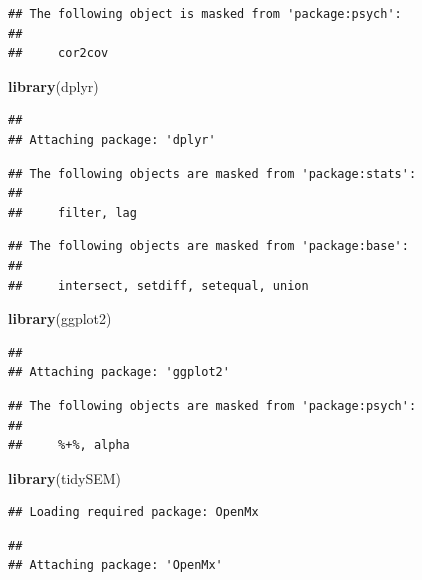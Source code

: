 \documentclass[
  11pt,
]{book}
\newenvironment{Shaded}{\begin{snugshade}}{\end{snugshade}}
\newcommand{\FunctionTok}[1]{\textcolor[rgb]{0.27,0.27,0.27}{\textbf{#1}}}
\newcommand{\NormalTok}[1]{#1}
\begin{document}
\begin{verbatim}
## The following object is masked from 'package:psych':
## 
##     cor2cov
\end{verbatim}

\begin{Shaded}
\begin{Highlighting}[]
\FunctionTok{library}\NormalTok{(dplyr)}
\end{Highlighting}
\end{Shaded}

\begin{verbatim}
## 
## Attaching package: 'dplyr'
\end{verbatim}

\begin{verbatim}
## The following objects are masked from 'package:stats':
## 
##     filter, lag
\end{verbatim}

\begin{verbatim}
## The following objects are masked from 'package:base':
## 
##     intersect, setdiff, setequal, union
\end{verbatim}

\begin{Shaded}
\begin{Highlighting}[]
\FunctionTok{library}\NormalTok{(ggplot2)}
\end{Highlighting}
\end{Shaded}

\begin{verbatim}
## 
## Attaching package: 'ggplot2'
\end{verbatim}

\begin{verbatim}
## The following objects are masked from 'package:psych':
## 
##     %+%, alpha
\end{verbatim}

\begin{Shaded}
\begin{Highlighting}[]
\FunctionTok{library}\NormalTok{(tidySEM)}
\end{Highlighting}
\end{Shaded}

\begin{verbatim}
## Loading required package: OpenMx
\end{verbatim}

\begin{verbatim}
## 
## Attaching package: 'OpenMx'
\end{verbatim}
\end{document}

